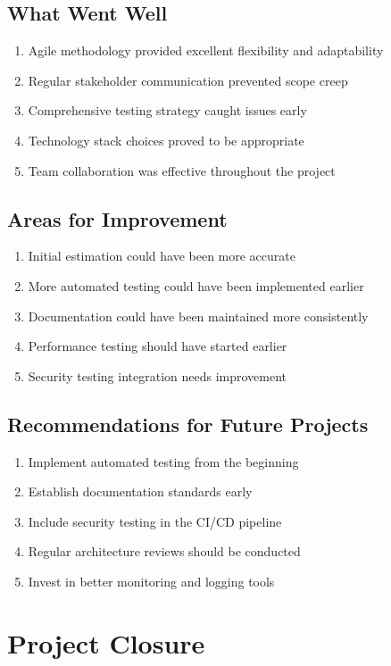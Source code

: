 \documentclass[12pt,a4paper]{article}
\begin{document}
\subsection{What Went Well}
\begin{enumerate}
    \item Agile methodology provided excellent flexibility and adaptability
    \item Regular stakeholder communication prevented scope creep
    \item Comprehensive testing strategy caught issues early
    \item Technology stack choices proved to be appropriate
    \item Team collaboration was effective throughout the project
\end{enumerate}

\subsection{Areas for Improvement}
\begin{enumerate}
    \item Initial estimation could have been more accurate
    \item More automated testing could have been implemented earlier
    \item Documentation could have been maintained more consistently
    \item Performance testing should have started earlier
    \item Security testing integration needs improvement
\end{enumerate}

\subsection{Recommendations for Future Projects}
\begin{enumerate}
    \item Implement automated testing from the beginning
    \item Establish documentation standards early
    \item Include security testing in the CI/CD pipeline
    \item Regular architecture reviews should be conducted
    \item Invest in better monitoring and logging tools
\end{enumerate}

\section{Project Closure}
\end{document}
